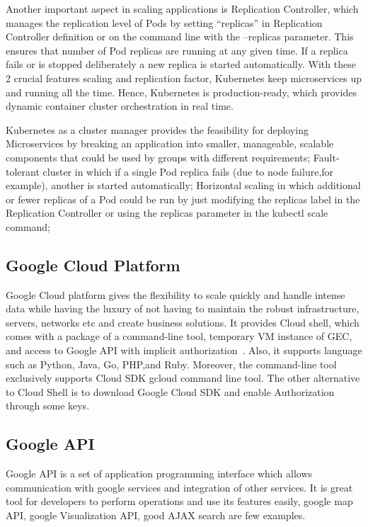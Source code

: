 Another important aspect in scaling applications is Replication
Controller, which manages the replication level of Pods by setting
“replicas” in Replication Controller definition or on the command line
with the –replicas parameter. This ensures that number of Pod replicas
are running at any given time. If a replica fails or is stopped
deliberately a new replica is started automatically. With these 2
crucial features scaling and replication factor, Kubernetes keep
microservices up and running all the time. Hence, Kubernetes is
production-ready, which provides dynamic container cluster
orchestration in real time.

Kubernetes as a cluster manager provides the feasibility for deploying
Microservices by breaking an application into smaller, manageable,
scalable components that could be used by groups with different
requirements; Fault-tolerant cluster in which if a single Pod replica
fails (due to node failure,for example), another is started
automatically; Horizontal scaling in which additional or fewer
replicas of a Pod could be run by just modifying the replicas label in
the Replication Controller or using the replicas parameter in the
kubectl scale command;

\subsection{Google Cloud Platform}

Google Cloud platform gives the flexibility to scale quickly and
handle intense data while having the luxury of not having to maintain
the robust infrastructure, servers, networks etc and create business
solutions. It provides Cloud shell, which comes with a package of a
command-line tool, temporary VM instance of GEC, and access to Google
API with implicit authorization~\cite{hid-sp18-602-cloud-shell}.
Also, it supports language such as Python, Java, Go, PHP,and Ruby.
Moreover, the command-line tool exclusively supports Cloud SDK gcloud
command line tool. The other alternative to Cloud Shell is to download
Google Cloud SDK and enable Authorization through some keys.

\subsection{Google API}

Google API is a set of application programming interface which allows
communication with google services and integration of other
services. It is great tool for developers to perform operations and
use its features easily, google map API, google Visualization API,
good AJAX search are few examples.


